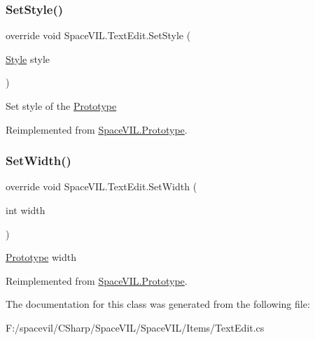 \subsubsection{\texorpdfstring{Set\+Style()}{SetStyle()}}
{\footnotesize\ttfamily override void Space\+V\+I\+L.\+Text\+Edit.\+Set\+Style (\begin{DoxyParamCaption}\item[{\mbox{\hyperlink{class_space_v_i_l_1_1_decorations_1_1_style}{Style}}}]{style }\end{DoxyParamCaption})\hspace{0.3cm}{\ttfamily [virtual]}}



Set style of the \mbox{\hyperlink{class_space_v_i_l_1_1_prototype}{Prototype}} 



Reimplemented from \mbox{\hyperlink{class_space_v_i_l_1_1_prototype_ae96644a6ace490afb376fb542161e541}{Space\+V\+I\+L.\+Prototype}}.

\mbox{\label{class_space_v_i_l_1_1_text_edit_a5e81be988e48303f9d552bdbe2953027}} 
\subsubsection{\texorpdfstring{Set\+Width()}{SetWidth()}}
{\footnotesize\ttfamily override void Space\+V\+I\+L.\+Text\+Edit.\+Set\+Width (\begin{DoxyParamCaption}\item[{int}]{width }\end{DoxyParamCaption})\hspace{0.3cm}{\ttfamily [virtual]}}



\mbox{\hyperlink{class_space_v_i_l_1_1_prototype}{Prototype}} width 



Reimplemented from \mbox{\hyperlink{class_space_v_i_l_1_1_prototype_a6a4f1b9581f4d18f1c3a3e287d4b2a2b}{Space\+V\+I\+L.\+Prototype}}.



The documentation for this class was generated from the following file\+:\begin{DoxyCompactItemize}
\item 
F\+:/spacevil/\+C\+Sharp/\+Space\+V\+I\+L/\+Space\+V\+I\+L/\+Items/Text\+Edit.\+cs\end{DoxyCompactItemize}
